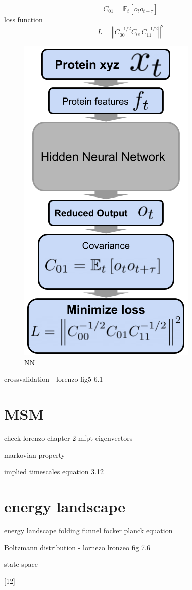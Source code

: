 $$C_{01}=\ensuremath{\mathbb{E}}_{t}\left[o_{t}o_{t+\tau}\right]$$
loss function
$$L=\left\Vert C_{00}^{-1/2}C_{01}C_{11}^{-1/2}\right\Vert ^{2}$$

\begin{figure}[H]
  \centering
  \includegraphics[width=0.4\linewidth]{figures3/NN.png}
  \caption{NN}
  \label{fig:NN}
\end{figure}


crossvalidation  - lorenzo fig5 6.1


\section{MSM}
check  lorenzo chapter 2
mfpt
eigenvectors

markovian property

implied timescales equation 3.12

\section{energy landscape }
energy landscape 
folding funnel
focker planck equation

Boltzmann distribution - lornezo
lronzeo fig 7.6

state space


[12]